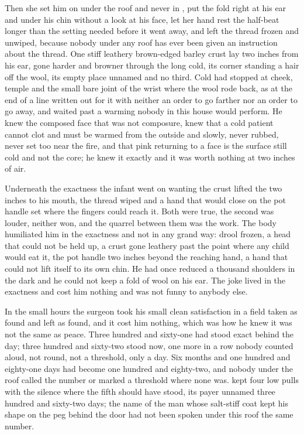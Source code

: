 Then she set him on  under the roof and never in , put the fold right at his ear and under his chin without a look at his face, let her hand rest the half-beat longer than the setting needed before it went away, and left the thread frozen and unwiped, because nobody under any roof has ever been given an instruction about the thread. One stiff leathery brown-edged barley crust lay two inches from his ear, gone harder and browner through the long cold, its corner standing a hair off the wool, its empty place unnamed and no third. Cold had stopped at cheek, temple and the small bare joint of the wrist where the wool rode back, as at the end of a line written out for it with neither an order to go farther nor an order to go away, and  waited past a warming nobody in this house would perform. He knew the composed face that was not composure, knew that a cold patient cannot clot and must be warmed from the outside and slowly, never rubbed, never set too near the fire, and that pink returning to a face is the surface still cold and not the core; he knew it exactly and it was worth nothing at two inches of air.

Underneath the exactness the infant went on wanting the crust lifted the two inches to his mouth, the thread wiped and a hand that would close on the pot handle set where the fingers could reach it. Both were true, the second was louder, neither won, and the quarrel between them was the work. The body humiliated him in the exactness and not in any grand way: drool frozen, a head that could not be held up, a crust gone leathery past the point where any child would eat it, the pot handle two inches beyond the reaching hand, a hand that could not lift itself to its own chin. He had once reduced a thousand shoulders in the dark and he could not keep a fold of wool on his ear. The joke lived in the exactness and cost him nothing and was not funny to anybody else.

\scenebreak

In the small hours the surgeon took his small clean satisfaction in a field taken as found and left as found, and it cost him nothing, which was how he knew it was not the same as peace. Three hundred and sixty-one had stood exact behind the day; three hundred and sixty-two stood now, one more in a row nobody counted aloud, not round, not a threshold, only a day. Six months and one hundred and eighty-one days had become one hundred and eighty-two, and nobody under the roof called the number or marked a threshold where none was.  kept four low pulls with the silence where the fifth should have stood, its payer unnamed three hundred and sixty-two days; the name of the man whose salt-stiff coat kept his shape on the peg behind the door had not been spoken under this roof the same number.

